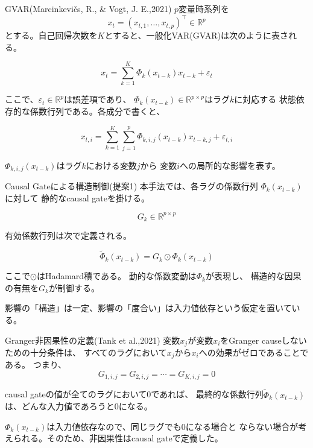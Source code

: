 \documentclass[dvipdfmx,11pt]{beamer}
\begin{document}
\begin{frame}{GVAR(Marcinkevičs, R., \& Vogt, J. E.,2021)}
  $p$変量時系列を
  \[
    x_t = (x_{t,1}, \ldots, x_{t,p})^\top \in \mathbb{R}^{p}
  \]
  とする。自己回帰次数を$K$とすると、一般化VAR(GVAR)は次のように表される。

  \[
    x_t
    =
    \sum_{k=1}^{K}
    \Phi_k(x_{t-k}) x_{t-k}
    +
    \varepsilon_t
  \]

  ここで、$\varepsilon_t \in \mathbb{R}^{p}$は誤差項であり、
  $\Phi_k(x_{t-k}) \in \mathbb{R}^{p \times p}$はラグ$k$に対応する
  状態依存的な係数行列である。各成分で書くと、

  \[
    x_{t,i}
    =
    \sum_{k=1}^{K}
    \sum_{j=1}^{p}
    \Phi_{k,i,j}(x_{t-k}) x_{t-k,j}
    +
    \varepsilon_{t,i}
  \]

  $\Phi_{k,i,j}(x_{t-k})$はラグ$k$における変数$j$から
  変数$i$への局所的な影響を表す。
\end{frame}

\begin{frame}{Causal Gateによる構造制御(提案1)}
  本手法では、各ラグの係数行列 $\Phi_k(x_{t-k})$に対して
  静的なcausal gateを掛ける。

  \[
    G_k \in \mathbb{R}^{p \times p}
  \]

  有効係数行列は次で定義される。

  \[
    \tilde{\Phi}_k(x_{t-k})
    =
    G_k \odot \Phi_k(x_{t-k})
  \]

  \vspace{0.5em}
  ここで$\odot$はHadamard積である。
  動的な係数変動は$\Phi_k$が表現し、
  構造的な因果の有無を$G_k$が制御する。

  \vspace{0.5em}
  影響の「構造」は一定、影響の「度合い」は入力値依存という仮定を置いている。
\end{frame}

\begin{frame}{Granger非因果性の定義(Tank et al.,2021)}
  変数$x_j$が変数$x_i$をGranger causeしないための十分条件は、
  すべてのラグにおいて$x_j$から$x_i$への効果がゼロであることである。
  つまり、
  \[
    G_{1,i,j} = G_{2,i,j} = \cdots = G_{K,i,j} = 0
  \]

  causal gateの値が全てのラグにおいて0であれば、
  最終的な係数行列$\tilde{\Phi}_k(x_{t-k})$は、どんな入力値であろうと0になる。

  $\Phi_k(x_{t-k})$は入力値依存なので、同じラグでも0になる場合と
  ならない場合が考えられる。そのため、非因果性はcausal gateで定義した。
\end{frame}
\end{document}

